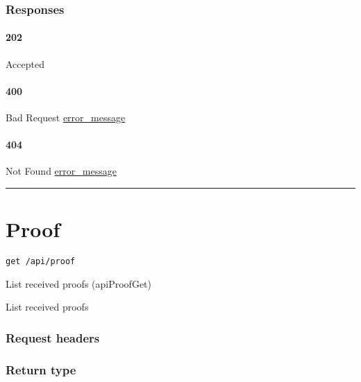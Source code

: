 \hypertarget{responses-95}{%
\subsubsection{Responses}\label{responses-95}}

\hypertarget{section-312}{%
\paragraph{202}\label{section-312}}

Accepted \protect\hyperlink{}{}

\hypertarget{section-313}{%
\paragraph{400}\label{section-313}}

Bad Request \protect\hyperlink{error_message}{error\_message}

\hypertarget{section-314}{%
\paragraph{404}\label{section-314}}

Not Found \protect\hyperlink{error_message}{error\_message}

\begin{center}\rule{0.5\linewidth}{\linethickness}\end{center}

\hypertarget{proof-1}{%
\section{\texorpdfstring{\protect\hypertarget{Proof}{}{Proof}}{Proof}}\label{proof-1}}

\protect\hypertarget{apiProofGet}{}{}

\begin{verbatim}
get /api/proof
\end{verbatim}

List received proofs ({apiProofGet})

List received proofs

\hypertarget{request-headers-50}{%
\subsubsection{Request headers}\label{request-headers-50}}

\hypertarget{return-type-75}{%
\subsubsection{Return type}\label{return-type-75}}


